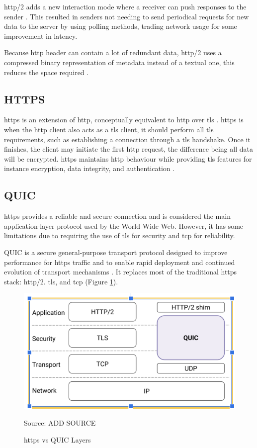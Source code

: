 \gls{http}/2 adds a new interaction mode where a receiver can push responses to the sender \cite{rfc7540}. This resulted in senders not needing to send periodical requests for new data to the server by using polling methods, trading network usage for some improvement in latency.

Because \gls{http} header can contain a lot of redundant data, \gls{http}/2 uses a compressed binary representation of metadata instead of a textual one, this reduces the space required \cite{rfc7540}.

\subsection{HTTPS}

\gls{https} is an extension of \gls{http}, conceptually equivalent to \gls{http} over \gls{tls} \cite{rfc2818}. \gls{https} is when the \gls{http} client also acts as a \gls{tls} client, it should perform all \gls{tls} requirements, such as establishing a connection through a \gls{tls} handshake. Once it finishes, the client may initiate the first \gls{http} request, the difference being all data will be encrypted. \gls{https} maintains \gls{http} behaviour while providing \gls{tls} features for instance encryption, data integrity, and authentication \cite{rfc2818}.

\subsection{QUIC}

\gls{https} provides a reliable and secure connection and is considered the main application-layer protocol used by the World Wide Web. However, it has some limitations due to requiring the use of \gls{tls} for security and \gls{tcp} for reliability.

QUIC is a secure general-purpose transport protocol designed to improve performance for \gls{https} traffic and to enable rapid deployment and continued evolution of transport mechanisms \cite{quic_protocol}. It replaces most of the traditional \gls{https} stack: \gls{http}/2. \gls{tls}, and \gls{tcp} (Figure \ref{figure:quic_http2_layers}).

\begin{figure}[ht]
    \centering
    \includegraphics[width=\linewidth]{figures/quic_http2_layers.png}
    \caption{\gls{https} vs QUIC Layers}
    {Source: ADD SOURCE}
    \label{figure:quic_http2_layers}
\end{figure}

